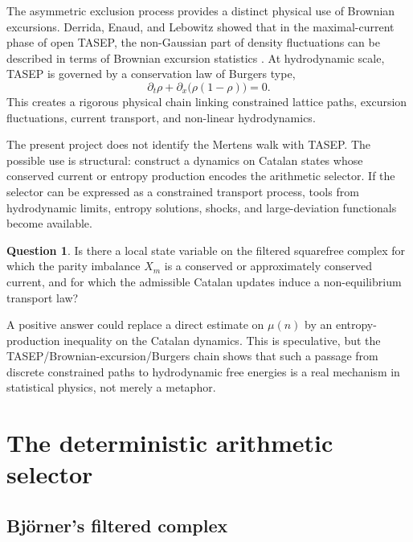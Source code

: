 \documentclass[11pt]{amsart}
\numberwithin{equation}{section}
\theoremstyle{plain}
\theoremstyle{definition}
\newtheorem{question}[theorem]{Question}
\theoremstyle{remark}
\newcommand{\Mob}{\mu}
\begin{document}
The asymmetric exclusion process provides a distinct physical use of Brownian excursions.  Derrida, Enaud, and Lebowitz showed that in the maximal-current phase of open TASEP, the non-Gaussian part of density fluctuations can be described in terms of Brownian excursion statistics \cite{DerridaEnaudLebowitz2004}.  At hydrodynamic scale, TASEP is governed by a conservation law of Burgers type,
\begin{equation}
\partial_t\rho
+
\partial_x\bigl(\rho(1-\rho)\bigr)
=0.
\label{eq:tasep_burgers}
\end{equation}
This creates a rigorous physical chain linking constrained lattice paths, excursion fluctuations, current transport, and non-linear hydrodynamics.

The present project does not identify the Mertens walk with TASEP.  The possible use is structural: construct a dynamics on Catalan states whose conserved current or entropy production encodes the arithmetic selector.  If the selector can be expressed as a constrained transport process, tools from hydrodynamic limits, entropy solutions, shocks, and large-deviation functionals become available.

\begin{question}
\label{question:selector_as_current}
Is there a local state variable on the filtered squarefree complex for which the parity imbalance $X_m$ is a conserved or approximately conserved current, and for which the admissible Catalan updates induce a non-equilibrium transport law?
\end{question}

A positive answer could replace a direct estimate on $\Mob(n)$ by an entropy-production inequality on the Catalan dynamics.  This is speculative, but the TASEP/Brownian-excursion/Burgers chain shows that such a passage from discrete constrained paths to hydrodynamic free energies is a real mechanism in statistical physics, not merely a metaphor.

\section{The deterministic arithmetic selector}
\label{sec:arithmetic_selector}

\subsection{Björner's filtered complex}
\label{subsec:bjorner_complex}
\end{document}
